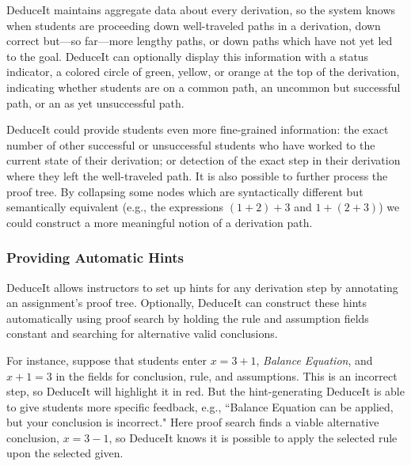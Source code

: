 \documentclass{sigchi}
\begin{document}
DeduceIt maintains aggregate data about every derivation, so the system knows when students are proceeding down well-traveled paths in a derivation, down correct but---so far---more lengthy paths, or down paths which have not yet led to the goal. DeduceIt can optionally display this information with a status indicator, a colored circle of green, yellow, or orange at the top of the derivation, indicating whether students are on a common path, an uncommon but successful path, or an as yet unsuccessful path. 

DeduceIt could provide students even more fine-grained information: the exact number of other successful or unsuccessful students who have worked to the current state of their derivation; or detection of the exact step in their derivation where they left the well-traveled path. It is also possible to further process the proof tree. By collapsing some nodes which are syntactically different but semantically equivalent (e.g., the expressions $(1+2)+3$ and $1+(2+3)$) we could construct a more meaningful notion of a derivation path. %

\subsubsection{Providing Automatic Hints}

DeduceIt allows instructors to set up hints for any derivation step by annotating an assignment's proof tree. Optionally, DeduceIt can construct these hints automatically using proof search by holding the rule and assumption fields constant and searching for alternative valid conclusions.

For instance, suppose that students enter $x=3+1$, \textit{Balance Equation}, and $x+1=3$ in the fields for conclusion, rule, and assumptions. This is an incorrect step, so DeduceIt will highlight it in red. But the hint-generating DeduceIt is able to give students more specific feedback, e.g., ``Balance Equation can be applied, but your conclusion is incorrect." Here proof search finds a viable alternative conclusion, $x=3-1$, so DeduceIt knows it is possible to apply the selected rule upon the selected given.
\end{document}
